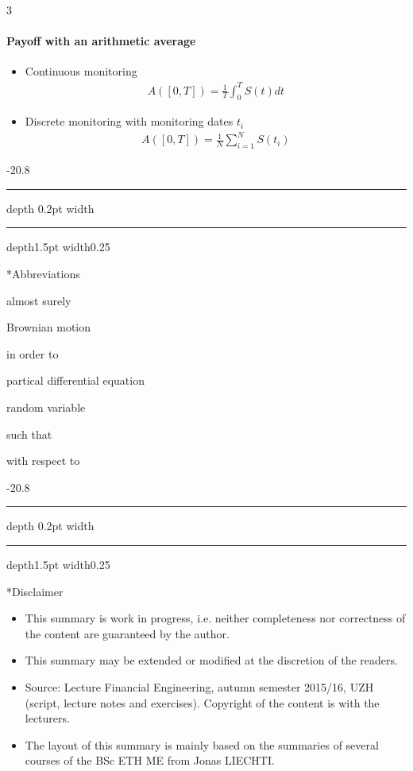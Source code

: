 \documentclass[a4paper,landscape,7pt,fleqn]{scrartcl}
\makeatletter
\renewcommand{\section}{\@startsection{section}{1}{0mm}%
{-2\baselineskip}{0.8\baselineskip}%
{\hrule depth 0.2pt width\columnwidth\hrule depth1.5pt
width0.25\columnwidth\vspace*{1.2em}\Large\bfseries}}
\makeatother
\begin{document}
\begin{multicols*}{3}
\paragraph{Payoff with an arithmetic average}
\begin{itemize}
\item Continuous monitoring
\begin{align*}
A([0,T]) = \frac{1}{T} \int_0^T S(t) dt
\end{align*}
\item Discrete monitoring with monitoring dates $t_i$
\begin{align*}
A([0,T]) = \frac{1}{N} \sum_{i=1}^N S(t_i)
\end{align*}
\end{itemize}

\columnbreak
\vfill

\section*{Abbreviations}

\begin{description}[style=multiline,leftmargin=1cm,font=\textbf]
\item[a.s.] almost surely
\item[BM] Brownian motion
\item[IOT] in order to
\item[PDE] partical differential equation
\item[RV] random variable
\item[s.t.] such that
\item[w.r.t.] with respect to
\end{description}

\section*{Disclaimer}

\begin{itemize}
\item This summary is work in progress, i.e. neither completeness nor correctness of the content are guaranteed by the author.
\item This summary may be extended or modified at the discretion of the readers.
\item Source: Lecture Financial Engineering, autumn semester 2015/16, UZH (script, lecture notes and exercises). Copyright of the content is with the lecturers.
\item The layout of this summary is mainly based on the summaries of several courses of the BSc ETH ME from Jonas LIECHTI.
\end{itemize}

\end{multicols*}
\end{document}
